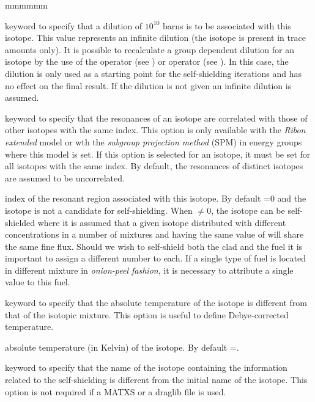 \begin{ListeDeDescription}{mmmmmm}
\item[\moc{INF}] keyword to specify that a dilution of $10^{10}$ barns is to
be associated with this isotope. This value represents an infinite dilution (the
isotope is present in trace amounts only). It is possible to
recalculate a group dependent dilution for an isotope by the use of the
 operator (see ) or  operator (see ). In this case, the dilution is only used
as a starting point for the self-shielding iterations and has no effect on the
final result. If the dilution is not given an infinite dilution is assumed.

\item[\moc{CORR}] keyword to specify that the resonances of an isotope are correlated
with those of other isotopes with the same  index. This option is only
available with the {\sl Ribon extended} model\cite{nse2004} or wth the {\sl subgroup
projection method} (SPM)\cite{SPM09}  in energy groups where
this model is set. If this option is selected for
an isotope, it must be set for all isotopes with the same  index. By default,
the resonances of distinct isotopes are assumed to be uncorrelated.

\item[\dusa{inrs}] index of the resonant region associated with this isotope.
By default =0 and the isotope is not a candidate for self-shielding.
When $\ne$0, the isotope can be self-shielded where it is assumed that a given
isotope distributed with different concentrations in a number of mixtures and
having the same value of  will share the same fine flux. 
Should we wish to self-shield both the clad and the fuel it is important
to assign a different  number
to each. If a single type of fuel is located in different mixture in
{\sl onion-peel fashion}, it is necessary to attribute a single  value
to this fuel.

\item[\moc{DBYE}] keyword to specify that the absolute temperature of the
isotope is different from that of the isotopic mixture. This option is useful to
define Debye-corrected temperature.

\item[\dusa{tempd}] absolute temperature (in Kelvin) of the isotope. By
default =.

\item[\moc{SHIB}] keyword to specify that the name of the isotope containing
the information related to the self-shielding is different from the initial name
of the isotope. This option is not required if a MATXS or a {\sc draglib} file is used.


\end{ListeDeDescription}
